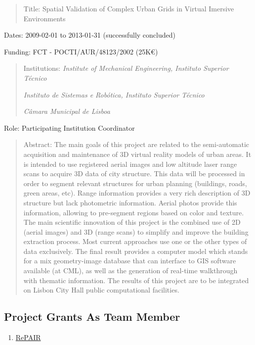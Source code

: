 \documentclass[
]{article}
\begin{document}
\begin{quote}
Title: Spatial Validation of Complex Urban Grids in Virtual Imersive
Environments
\end{quote}

Dates: 2009-02-01 to 2013-01-31 (successfully concluded)

Funding: FCT - POCTI/AUR/48123/2002 (25K€)

\begin{quote}
Institutions: \emph{Institute of Mechanical Engineering, Instituto
Superior Técnico}

\emph{Instituto de Sistemas e Robótica, Instituto Superior Técnico}

\emph{Câmara Municipal de Lisboa}
\end{quote}

Role: Participating Institution Coordinator

\begin{quote}
Abstract: The main goals of this project are related to the
semi-automatic acquisition and maintenance of 3D virtual reality models
of urban areas. It is intended to use registered aerial images and low
altitude laser range scans to acquire 3D data of city structure. This
data will be processed in order to segment relevant structures for urban
planning (buildings, roads, green areas, etc). Range information
provides a very rich description of 3D structure but lack photometric
information. Aerial photos provide this information, allowing to
pre-segment regions based on color and texture. The main scientific
innovation of this project is the combined use of 2D (aerial images) and
3D (range scans) to simplify and improve the building extraction
process. Most current approaches use one or the other types of data
exclusively. The final result provides a computer model which stands for
a mix geometry-image database that can interface to GIS software
available (at CML), as well as the generation of real-time walkthrough
with thematic information. The results of this project are to be
integrated on Lisbon City Hall public computational facilities.
\end{quote}

\subsection{Project Grants As Team
Member}\label{project-grants-as-team-member}

\begin{enumerate}
\def\labelenumi{\arabic{enumi}.}
\item
  \ul{RePAIR}
\end{enumerate}
\end{document}
